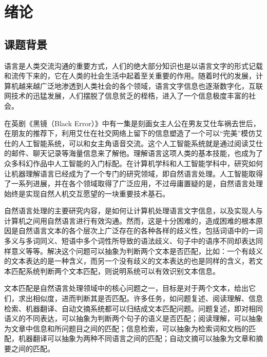 \chapter{绪论}

\section{课题背景}

语言是人类交流沟通的重要方式，人们的绝大部分知识也是以语言文字的形式记载和流传下来的，它在人类的社会生活中起着至关重要的作用。随着时代的发展，计算机越来越广泛地渗透到人类社会的各个领域，语言文字信息也逐渐数字化，互联网技术的迅猛发展，人们摆脱了信息贫乏的桎梏，进入了一个信息极度丰富的社会。

在英剧《黑镜（Black Error）》中有一集是刻画女主人公在男友艾仕车祸去世后，在朋友的推荐下，利用艾仕在社交网络上留下的信息塑造了一个可以“完美”模仿艾仕的人工智能系统，可以和女主角语音交流。这个人工智能系统就是通过阅读艾仕的邮件、聊天记录等海量信息来了解他。理解语言这项人类的基本技能，也成为了众多科幻作品中人工智能的入门标配。在计算机学科和人工智能学科中，研究如何让机器理解语言已经成为了一个专门的研究领域，即自然语言处理。人工智能取得了一系列进展，并在各个领域取得了广泛应用，不过毋庸置疑的是，自然语言处理始终是实现自然人机交互愿望的一块重要技术基石。

自然语言处理的主要研究内容，是如何让计算机处理语言文字信息，以及实现人与计算机之间用自然语言进行有效沟通。然而，这是十分困难的，造成困难的根本原因是自然语言文本的各个层次上广泛存在的各种各样的歧义性，包括词语中的一词多义与多词同义、短语中多个词性所导致的语法歧义、句子中的语序不同却表达同样意义等等。解决这个问题可以抽象为判断两个文本是否匹配，比如：一个有歧义的文本表达的是一种含义，而另一个没有歧义的文本表达的也是同样的含义，若文本匹配系统判断两个文本匹配，则说明系统可以有效识别文本信息。

文本匹配是自然语言处理领域中的核心问题之一，目标是对于两个文本，给出它们，求出相似度，进而判断其是否匹配。许多任务，如问题复述、阅读理解、信息检索、机器翻译、自动文摘系统都可以归结成文本匹配问题。问题复述，即对相同语义的不同表达，可以抽象为判断两个句子的语义是否匹配；阅读理解，可以抽象为文章中信息和所问题目之间的匹配；信息检索，可以抽象为检索词和文档的匹配，机器翻译可以抽象为两种不同语言之间的匹配；自动文摘可以抽象为文章和摘要之间的匹配。

